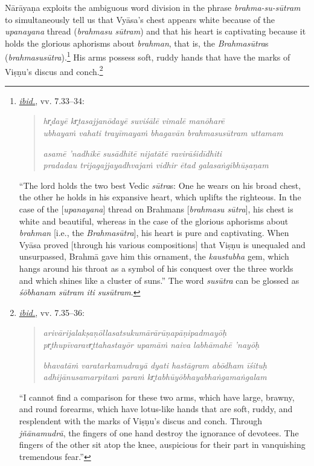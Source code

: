  Nārāyaṇa exploits the ambiguous word division in the phrase \emph{brahma-su-sūtram} to simultaneously tell us that Vyāsa’s chest appears white because of the \emph{upanayana} thread (\emph{brahmasu sūtram}) and that his heart is captivating because it holds the glorious aphorisms about \emph{brahman}, that is, the \emph{{Brahmasūtra}}s (\emph{brahmasusūtra}).\footnote{%
\hyperref[NarayanaPandita2017]{\emph{ibid.}}, vv. 7.33–34:\setlength{\parindent}{2em}

\vspace{-1.5ex}\begin{quote}\raggedright
      \emph{hr̥dayē kr̥tasajjanōdayē suviśālē vimalē manōharē}\\
\emph{ubhayaṁ vahati trayīmayaṁ bhagavān brahmasusūtram uttamam}

\emph{asamē ’nadhikē susādhitē nijatātē ravirāśidīdhiti}\\
\emph{pradadau trijagajjayadhvajaṁ vidhir ētad galasaṅgibhūṣaṇam}\end{quote}\vspace{-1.5ex}
      

\noindent{}“The lord holds the two best Vedic \emph{sūtra}s: One he wears on his broad chest, the other he holds in his expansive heart, which uplifts the righteous. In the case of the [\emph{upanayana}] thread on Brahmans [\emph{brahmasu sūtra}], his chest is white and beautiful, whereas in the case of the glorious aphorisms about \emph{brahman} [i.e., the \emph{{Brahmasūtra}}], his heart is pure and captivating. When Vyāsa proved [through his various compositions] that Viṣṇu is unequaled and unsurpassed, Brahmā gave him this ornament, the \emph{kaustubha} gem, which hangs around his throat as a symbol of his conquest over the three worlds and which shines like a cluster of suns.” The word \emph{susūtra} can be glossed as \emph{śōbhanam sūtram iti susūtram}.
}
 His arms possess soft, ruddy hands that have the marks of Viṣṇu’s discus and conch.\footnote{%
\hyperref[NarayanaPandita2017]{\emph{ibid.}}, vv. 7.35–36:\setlength{\parindent}{2em}

\vspace{-1.5ex}\begin{quote}\raggedright
      \emph{arivārijalakṣaṇōllasatsukumārārūṇapāṇipadmayōḥ}\\
\emph{pr̥thupīvaravr̥ttahastayōr upamāṁ naiva labhāmahē ’nayōḥ}

\emph{bhavatāṁ varatarkamudrayā dyati hastāgram abōdham īśituḥ}\\
\emph{adhijānusamarpitaṁ paraṁ kr̥tabhūyōbhayabhaṅgamaṅgalam}\end{quote}\vspace{-1.5ex}
      

\noindent{}“I cannot find a comparison for these two arms, which have large, brawny, and round forearms, which have lotus-like hands that are soft, ruddy, and resplendent with the marks of Viṣṇu’s discus and conch. Through \emph{jñānamudrā}, the fingers of one hand destroy the ignorance of devotees. The fingers of the other sit atop the knee, auspicious for their part in vanquishing tremendous fear.”
}
